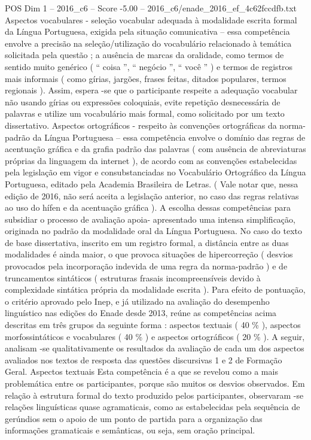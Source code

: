 \begin{textsample}{POS Dim 1 – 2016\_c6 – Score -5.00 – 2016\_c6/enade\_2016\_ef\_4c62fccdfb.txt}
Aspectos vocabulares - seleção vocabular adequada à modalidade escrita formal da Língua Portuguesa, exigida pela situação comunicativa – essa competência envolve a precisão na seleção/utilização do vocabulário relacionado à temática solicitada pela questão ; a ausência de marcas da oralidade, como termos de sentido muito genérico ( “ coisa ”, “ negócio ”, “ você ” ) e termos de registros mais informais ( como gírias, jargões, frases feitas, ditados populares, termos regionais ).
Assim, espera -se que o participante respeite a adequação vocabular não usando gírias ou expressões coloquiais, evite repetição desnecessária de palavras e utilize um vocabulário mais formal, como solicitado por um texto dissertativo.
Aspectos ortográficos - respeito às convenções ortográficas da norma-padrão da Língua Portuguesa – essa competência envolve o domínio das regras de acentuação gráfica e da grafia padrão das palavras ( com ausência de abreviaturas próprias da linguagem da internet ), de acordo com as convenções estabelecidas pela legislação em vigor e consubstanciadas no Vocabulário Ortográfico da Língua Portuguesa, editado pela Academia Brasileira de Letras. ( Vale notar que, nessa edição de 2016, não será aceita a legislação anterior, no caso das regras relativas ao uso do hífen e da acentuação gráfica ).
A escolha dessas competências para subsidiar o processo de avaliação apoia- apresentado uma intensa simplificação, originada no padrão da modalidade oral da Língua Portuguesa.
No caso do texto de base dissertativa, inscrito em um registro formal, a distância entre as duas modalidades é ainda maior, o que provoca situações de hipercorreção ( desvios provocados pela incorporação indevida de uma regra da norma-padrão ) e de truncamentos sintáticos ( estruturas frasais incompreensíveis devido à complexidade sintática própria da modalidade escrita ).
Para efeito de pontuação, o critério aprovado pelo Inep, e já utilizado na avaliação do desempenho linguístico nas edições do Enade desde 2013, reúne as competências acima descritas em três grupos da seguinte forma : aspectos textuais ( 40 \% ), aspectos morfossintáticos e vocabulares ( 40 \% ) e aspectos ortográficos ( 20 \% ).
A seguir, analisam -se qualitativamente os resultados da avaliação de cada um dos aspectos avaliados nos textos de resposta das questões discursivas 1 e 2 de Formação Geral.
Aspectos textuais Esta competência é a que se revelou como a mais problemática entre os participantes, porque são muitos os desvios observados.
Em relação à estrutura formal do texto produzido pelos participantes, observaram -se relações linguísticas quase agramaticais, como as estabelecidas pela sequência de gerúndios sem o apoio de um ponto de partida para a organização das informações gramaticais e semânticas, ou seja, sem oração principal.

\end{textsample}
